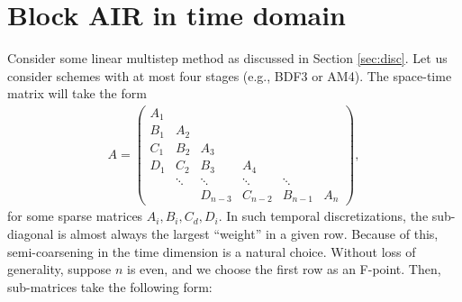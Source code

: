 \documentclass[a4paper,12pt]{article}
\begin{document}
\newpage
\section{Block AIR in time domain}

Consider some linear multistep method as discussed in Section \ref{sec:disc}. Let us consider schemes
with at most four stages (e.g., BDF3 or AM4). The space-time matrix will take the form
%
\begin{align*}
A = 
\begin{pmatrix}
	A_{1} \\ 
	B_{1} & A_2 \\ 
	C_1 & B_2 & A_3 \\
	D_1 & C_2 & B_3 & A_4 \\
	& \ddots & \ddots & \ddots & \ddots \\
	& & D_{n-3} & C_{n-2} & B_{n-1} & A_n
\end{pmatrix},
\end{align*}
%
for some sparse matrices $A_i,B_i,C_d,D_i$. In such temporal discretizations, the sub-diagonal is
almost always the largest ``weight'' in a given row. Because of this, semi-coarsening in the time
dimension is a natural choice. Without loss of generality, suppose $n$ is even, and we choose the
first row as an F-point. Then, sub-matrices take the following form:
%
\end{document}
